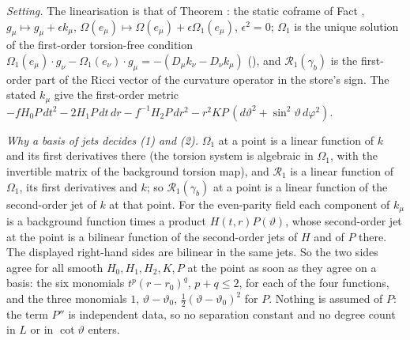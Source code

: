 \emph{Setting.} The linearisation is that of Theorem : the static coframe of Fact , $g_{\mu} \mapsto g_{\mu} + \epsilon k_{\mu}$, $\Omega(e_{\mu}) \mapsto \Omega(e_{\mu}) + \epsilon\Omega_{1}(e_{\mu})$, $\epsilon^{2} = 0$; $\Omega_{1}$ is the unique solution of the first-order torsion-free condition $\Omega_{1}(e_{\mu}) \cdot g_{\nu} - \Omega_{1}(e_{\nu}) \cdot g_{\mu} = -(D_{\mu}k_{\nu} - D_{\nu}k_{\mu})$ (), and $\mathcal{R}_{1}(\gamma_{b})$ is the first-order part of the Ricci vector of the curvature operator in the store's sign. The stated $k_{\mu}$ give the first-order metric $-fH_{0}P\,dt^{2} - 2H_{1}P\,dt\,dr - f^{-1}H_{2}P\,dr^{2} - r^{2}KP\,(d\vartheta^{2} + \sin^{2}\vartheta\,d\varphi^{2})$.

\emph{Why a basis of jets decides (1) and (2).} $\Omega_{1}$ at a point is a linear function of $k$ and its first derivatives there (the torsion system is algebraic in $\Omega_{1}$, with the invertible matrix of the background torsion map), and $\mathcal{R}_{1}$ is a linear function of $\Omega_{1}$, its first derivatives and $k$; so $\mathcal{R}_{1}(\gamma_{b})$ at a point is a linear function of the second-order jet of $k$ at that point. For the even-parity field each component of $k_{\mu}$ is a background function times a product $H(t,r)P(\vartheta)$, whose second-order jet at the point is a bilinear function of the second-order jets of $H$ and of $P$ there. The displayed right-hand sides are bilinear in the same jets. So the two sides agree for all smooth $H_{0}, H_{1}, H_{2}, K, P$ at the point as soon as they agree on a basis: the six monomials $t^{p}(r - r_{0})^{q}$, $p + q \leq 2$, for each of the four functions, and the three monomials $1$, $\vartheta - \vartheta_{0}$, $\tfrac12(\vartheta - \vartheta_{0})^{2}$ for $P$. Nothing is assumed of $P$: the term $P''$ is independent data, so no separation constant and no degree count in $L$ or in $\cot\vartheta$ enters.

